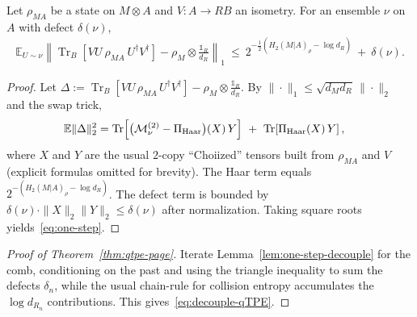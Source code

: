 \begin{lemma}\label{lem:one-step-decouple}
Let $\rho_{MA}$ be a state on $M\!\otimes\!A$ and $V:A\!\to\!RB$ an isometry. For an ensemble $\nu$ on $A$ with defect $\delta(\nu)$,
\begin{align}
\mathbb{E}_{U\sim\nu}\left\| \operatorname{Tr}_B\!\left[ VU\ \rho_{MA}\ U^\dagger V^\dagger \right] - \rho_M\otimes\frac{\mathbb{1}_R}{d_R} \right\|_1
\ \le\ 2^{-\frac12\!\left(H_2(M|A)_\rho-\log d_R\right)}\ +\ \delta(\nu).\label{eq:one-step}
\end{align}
\end{lemma}
\begin{proof}
Let $\Delta:=\operatorname{Tr}_B[VU\,\rho_{MA}\,U^\dagger V^\dagger]-\rho_M\otimes\frac{\mathbb{1}_R}{d_R}$. By $\|\cdot\|_1\le \sqrt{d_Md_R}\,\|\cdot\|_2$ and the swap trick,
\begin{align}
\mathbb{E}\|\Delta\|_2^2
&= \operatorname{Tr}\!\left[\big(\mathcal{M}^{(2)}_\nu-\Pi_{\rm Haar}\big)(X)\,Y\right]\ +\ \operatorname{Tr}\!\left[\Pi_{\rm Haar}(X)\,Y\right],\nonumber
\end{align}
where $X$ and $Y$ are the usual $2$-copy ``Choiized'' tensors built from $\rho_{MA}$ and $V$ (explicit formulas omitted for brevity). The Haar term equals $2^{-(H_2(M|A)_\rho-\log d_R)}$. The defect term is bounded by $\delta(\nu)\cdot\|X\|_2\|Y\|_2\le \delta(\nu)$ after normalization. Taking square roots yields~\eqref{eq:one-step}.
\end{proof}

\begin{proof}[Proof of Theorem~\ref{thm:qtpe-page}]
Iterate Lemma~\ref{lem:one-step-decouple} for the comb, conditioning on the past and using the triangle inequality to sum the defects $\delta_n$, while the usual chain-rule for collision entropy accumulates the $\log d_{R_n}$ contributions. This gives~\eqref{eq:decouple-qTPE}.
\end{proof}

